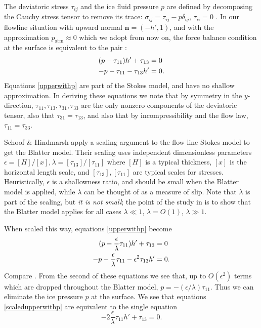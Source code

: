 \documentclass[11pt,final,reqno]{amsart}
\theoremstyle{remark}
\theoremstyle{definition}
\newcommand{\eps}{\epsilon}
\begin{document}
The deviatoric stress $\tau_{ij}$ and the ice fluid pressure $p$ are defined by decomposing the Cauchy stress tensor to remove its trace: $\sigma_{ij} = \tau_{ij} - p \delta_{ij}$, $\tau_{ii}=0$ \cite[equation (3.133); note summation convention]{GreveBlatter2009}.  In our flowline situation with upward normal $\mathbf{n}=(-h',1)$, and with the approximation $p_{\text{atm}}\approx 0$ which we adopt from now on, the force balance condition at the surface is equivalent to the pair \cite[equations (2.9) and (2.10)]{SchoofHindmarsh}:
\begin{align}
(p - \tau_{11})h' + \tau_{13} &= 0 \label{upperwithp}\\
-p - \tau_{11} - \tau_{13} h' &= 0. \notag
\end{align}
Equations \eqref{upperwithp} are part of the Stokes model, and have no shallow approximation.  In deriving these equations we note that by symmetry in the $y$-direction, $\tau_{11},\tau_{13},\tau_{31},\tau_{33}$ are the only nonzero components of the deviatoric tensor, also that $\tau_{31}=\tau_{13}$, and also that by incompressibility and the flow law, $\tau_{11}=\tau_{33}$.

Schoof \& Hindmarsh \cite{SchoofHindmarsh} apply a scaling argument to the flow line Stokes model to get the Blatter model.  Their scaling uses independent dimensionless parameters $\eps = [H]/[x], \lambda = [\tau_{13}]/[\tau_{11}]$ where $[H]$ is a typical thickness, $[x]$ is the horizontal length scale, and $[\tau_{13}],[\tau_{11}]$ are typical scales for stresses.  Heuristically, $\eps$ is a shallowness ratio, and should be small when the Blatter model is applied, while $\lambda$ can be thought of as a measure of slip.  Note that $\lambda$ is part of the scaling, but \emph{it is not small}; the point of the study in \cite{SchoofHindmarsh} is to show that the Blatter model applies for all cases $\lambda \ll 1$, $\lambda = O(1)$, $\lambda \gg 1$.

When scaled this way, equations \eqref{upperwithp} become
\newcommand{\eol}{\frac{\eps}{\lambda}}
\begin{align}
(p - \eol \tau_{11})h' + \tau_{13} &= 0 \label{scaledupperwithp}\\
-p - \eol \tau_{11} - \eps^2 \tau_{13} h' &= 0. \notag
\end{align}
Compare \cite[equations (2.29) and (2.30)]{SchoofHindmarsh}.  From the second of these equations we see that, up to $O(\eps^2)$ terms which are dropped throughout the Blatter model, $p = - (\eps/\lambda) \tau_{11}$.  Thus we can eliminate the ice pressure $p$ at the surface.  We see that equations \eqref{scaledupperwithp} are equivalent to the single equation
\begin{equation}
- 2 \eol \tau_{11} h' + \tau_{13} = 0. \label{droppedupper}
\end{equation}
\end{document}
